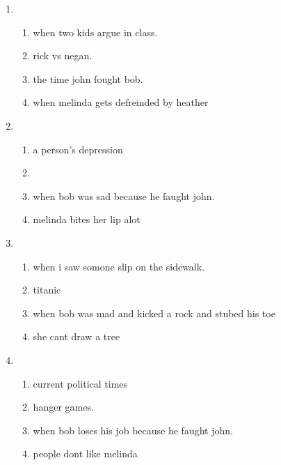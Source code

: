 

\begin{enumerate}
\item \begin{enumerate}
  \item when two kids argue in class.
  \item rick vs negan.
  \item the time john fought bob.
  \item when melinda gets defreinded by heather
  \end{enumerate}
\item \begin{enumerate}
  \item a person's depression
  \item 
  \item when bob was sad because he faught john.  
  \item melinda bites her lip alot
  \end{enumerate}
\item \begin{enumerate}
  \item when i saw somone slip on the sidewalk.
  \item titanic
  \item when bob was mad and kicked a rock and stubed his toe
  \item she cant draw a tree
  \end{enumerate}
\item \begin{enumerate}
  \item current political times
  \item hanger games.
  \item when bob loses his job because he faught john.
  \item people dont like melinda
\end{enumerate}
\end{enumerate}


